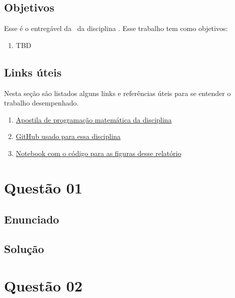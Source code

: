 \documentclass[10pt, a4paper]{article}
\begin{document}
\subsection{Objetivos}

Esse é o entregável da \TITLE \ da disciplina \DISCIPLINE. Esse trabalho tem como objetivos:

\begin{enumerate}
  \item TBD
\end{enumerate}

\subsection{Links úteis}\label{links}

Nesta seção são listados alguns links e referências úteis para se entender o trabalho desempenhado.

\begin{enumerate}
  \item \href{https://web.tecgraf.puc-rio.br/~ivan/MEC2403/ProgMatematica_VazPereiraMenezes-Ago2012.pdf}{Apostila de programação matemática da disciplina}
  \item \href{https://github.com/prj-phcp/MEC2403_Activities}{GitHub usado para essa disciplina}
  \item \href{https://github.com/prj-phcp/MEC2403_Activities/blob/master/Lista1/Lista1.ipynb}{Notebook com o código para as figuras desse relatório}
\end{enumerate}

\section{Questão 01}

\subsection{Enunciado}

\lipsum[1-3]

\subsection{Solução}

\lipsum[4-6]

\section{Questão 02}
\end{document}
